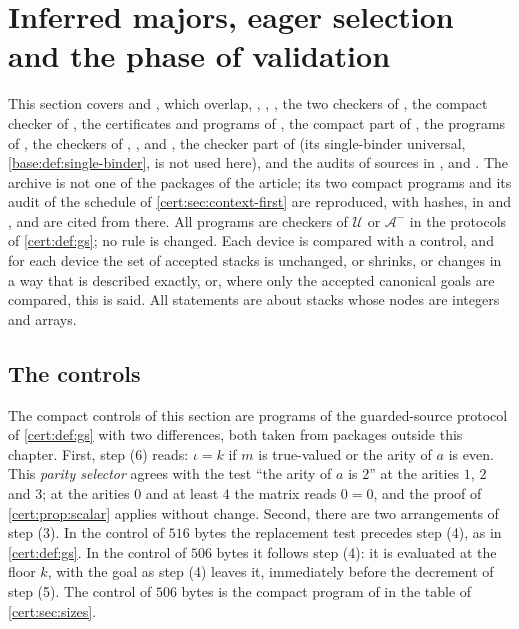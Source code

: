 \section{Inferred majors, eager selection and the phase of validation}\label{cert:sec:later}

This section covers  and , which
overlap, , ,
, the two checkers of , the
compact checker of , the certificates and programs of
, the compact part of , the programs of
, the checkers of ,
,  and
, the checker part of  (its
single-binder universal, \cref{base:def:single-binder}, is not used here), and the audits of
sources in ,  and
. The archive  is not one of
the packages of the article; its two compact programs and its audit of the
schedule of \cref{cert:sec:context-first} are reproduced, with hashes, in
 and , and are cited from there. All
programs are checkers of $\mathcal U$ or
$\mathcal A^{-}$ in the protocols of \cref{cert:def:gs}; no rule is changed.
Each device is compared with a control, and for each device the set of
accepted stacks is unchanged, or shrinks, or changes in a way that is
described exactly, or, where only the accepted canonical goals are compared,
this is said. All statements are about stacks whose nodes are integers
and arrays.

\subsection{The controls}

The compact controls of this section are programs of the guarded-source
protocol of \cref{cert:def:gs} with two differences, both taken from packages
outside this chapter. First, step (6) reads: $\iota=k$ if $m$ is true-valued
or the arity of $a$ is even. This \emph{parity selector} agrees with the test
``the arity of $a$ is $2$'' at the arities $1$, $2$ and $3$; at the arities $0$
and at least $4$ the matrix reads $0=0$, and the proof of
\cref{cert:prop:scalar} applies without change. Second, there are two
arrangements of step (3). In the control of $516$ bytes the replacement test
precedes step (4), as in \cref{cert:def:gs}. In the control of $506$ bytes it
follows step (4): it is evaluated at the floor $k$, with the goal as step (4)
leaves it, immediately before the decrement of step (5). The control of $506$
bytes is the compact program of  in the table
of \cref{cert:sec:sizes}.

